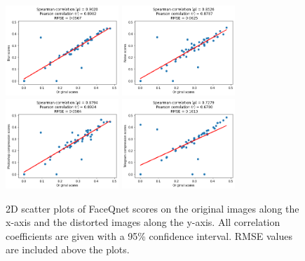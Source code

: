 \begin{figure}[h]
\centering
    \subfloat
        {\includegraphics[width=0.38\textwidth]{figures/FaceQnetBlur.png}}
    \subfloat
        {\includegraphics[width=0.38\textwidth]{figures/FaceQnetNoise.png}}
        \quad
    \subfloat
        {\includegraphics[width=0.38\textwidth]{figures/FaceQnetPhotoshop.png}}
    \subfloat
        {\includegraphics[width=0.38\textwidth]{figures/FaceQnetTelegram.png}}
    \caption{2D scatter plots of FaceQnet scores on the original images along the x-axis and the distorted images along the y-axis. All correlation coefficients are given with a 95\% confidence interval. RMSE values are included above the plots.}
    \label{fig:NFCFaceCorr}
\end{figure}

